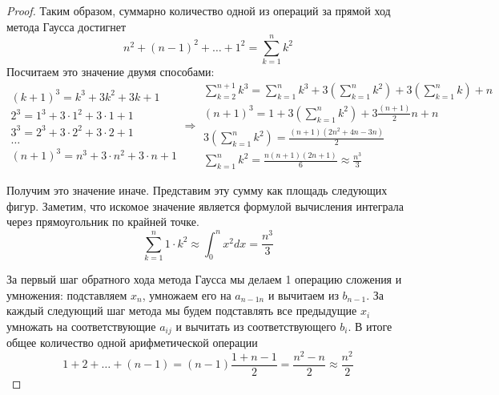 \begin{proof}
  Таким образом, суммарно количество одной из операций за прямой ход метода Гаусса достигнет
  \[n^2+(n-1)^2+\ldots+1^2=\sum_{k=1}^nk^2\]
  Посчитаем это значение двумя способами:
  \[\begin{aligned}
      (k+1)^3=k^3+3k^2+3k+1        \\
      2^3=1^3+3\cdot 1^2+3\cdot1+1 \\
      3^3=2^3+3\cdot 2^2+3\cdot2+1 \\
      \ldots                       \\
      (n+1)^3=n^3+3\cdot n^2+3\cdot n+1
    \end{aligned}\Rightarrow
    \begin{aligned}
      \sum_{k=2}^{n+1}k^3=\sum_{k=1}^{n}k^3+3\left(\sum_{k=1}^{n}k^2\right)+3\left(\sum_{k=1}^{n}k\right)+n \\
      (n+1)^3 = 1 + 3\left(\sum_{k=1}^{n}k^2\right)+3\frac{(n+1)}{2}n+n                                     \\
      3\left(\sum_{k=1}^{n}k^2\right)=\frac{(n+1)(2n^2+4n-3n)}{2}                                           \\
      \sum_{k=1}^{n}k^2=\frac{n(n+1)(2n+1)}{6}\approx\frac{n^3}{3}
    \end{aligned}
  \]
  \begin{minipage}{0.3\linewidth}
    \centering
  \end{minipage}\hfill
  \begin{minipage}{0.7\linewidth}
    Получим это значение иначе. Представим эту сумму как площадь следующих фигур.
    Заметим, что искомое значение является формулой вычисления интеграла
    через прямоугольник по крайней точке.
    \[\sum_{k=1}^{n}1\cdot k^2\approx \int_0^nx^2dx=\frac{n^3}{3}\]
  \end{minipage}

  За первый шаг обратного хода метода Гаусса мы делаем 1 операцию сложения и умножения:
  подставляем $x_{n}$, умножаем его на $a_{n-1n}$ и вычитаем из $b_{n-1}$.
  За каждый следующий шаг метода мы будем подставлять все предыдущие $x_i$
  умножать на соответствующие $a_{ij}$ и вычитать из соответствующего $b_i$.
  В итоге общее количество одной арифметической операции
  \[1+2+\ldots+(n-1)=(n-1)\frac{1+n-1}{2}=\frac{n^2-n}{2}\approx \frac{n^2}{2}\]
\end{proof}

